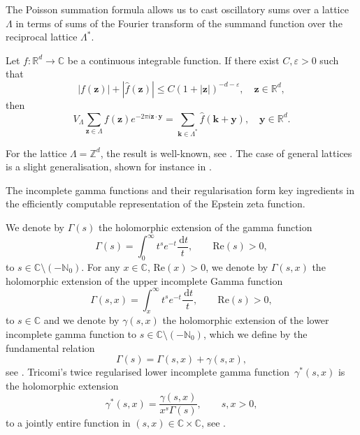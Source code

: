 \documentclass[]{amsart}
\newcommand{\new}[1]{#1}
\renewcommand{\d}{\,\mathrm{d}}
\renewcommand{\Re}[1]{\mathrm{Re}(#1)}
\numberwithin{mythm}{section}
\begin{document}
The Poisson summation formula allows us to cast oscillatory sums over a lattice $\Lambda$ in terms of sums of the Fourier transform of the summand function over the reciprocal lattice $\Lambda^*$. 
\begin{lemma}
Let $f:\mathds{R}^d \rightarrow \mathds{C}$ be a continuous integrable function. If there exist $C,\varepsilon>0$ such that
\[|f(\bm z)|+|\hat{f}(\bm z)| \leq C (1+ |\bm z|)^{-d-\varepsilon},\quad \bm z\in \mathds R^d,\]
then 
\[V_\Lambda \sum_{\bm z \in {\Lambda}} f(\bm z ) e^{-2\pi i \bm z \cdot \bm y} = \sum_{\bm k \in \Lambda^\ast} \hat{f}(\bm k+\bm y),\quad \bm y\in \mathds R^d.\]
\end{lemma}
For the lattice $\Lambda=\mathds Z^d$, the result is well-known, see \cite[Corollary 2.6]{steinweiss1972fourier}. The case of general lattices is a slight generalisation, shown for instance in \cite[Lemma 3.2]{buchheit2022singular}.

The incomplete gamma functions and their regularisation form key ingredients in the efficiently computable representation of the Epstein zeta function.


\begin{remark}
\label{gammaGammaStar}
We denote by $\Gamma(s)$ the holomorphic extension of the gamma function 
$$
\new{
\Gamma(s)=
\int_0^{\infty}t^{s}e^{-t}\frac{\d t}{t}
,\qquad \Re{s}>0,
}
$$
to $s\in\mathds C\setminus(-\mathds N_0)$.
For any $x\in\mathds C$, $\Re x > 0$,
we denote 
by $\Gamma(s,x)$ the holomorphic extension of the upper incomplete Gamma function
$$
\new{
\Gamma(s,x)=
\int_x^{\infty}t^{s}e^{-t}\frac{\d t}{t}
,\qquad \Re{s}>0,
}
$$
to  
$s\in\mathds C$ 
and 
we denote by $\gamma(s,x)$ the holomorphic extension of the lower incomplete gamma function 
to 
$s\in \mathds C\setminus (-\mathds N_0)$,
\new{which we define by}
the fundamental relation
$$\Gamma(s)=\Gamma(s,x)+\gamma(s,x),
$$
see \cite[Section §8.2(ii)]{NIST:DLMF}.
Tricomi's twice regularised lower incomplete 
gamma function~$\gamma^*(s,x)$ is the holomorphic extension
$$
\gamma^*(s, x) = \frac{\gamma(s, x)}{x^s \Gamma(s)}
,\qquad s,x>0,
$$
to a jointly entire function in  $(s,x)\in\mathds C\times \mathds C$, see \cite{Tricomi}. 
\end{remark}
\end{document}

